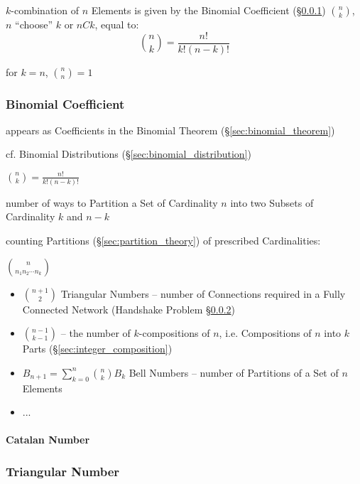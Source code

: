$k$-combination of $n$ Elements is given by the Binomial Coefficient
(\S\ref{sec:binomial_coefficient}) $\binom{n}{k}$, $n$ ``choose'' $k$ or $nCk$,
equal to:
\[
  \binom{n}{k} = \frac{n!}{k!(n - k)!}
\]

for $k = n$, $\binom{n}{n} = 1$



\subsubsection{Binomial Coefficient}\label{sec:binomial_coefficient}

appears as Coefficients in the Binomial Theorem (\S\ref{sec:binomial_theorem})

cf. Binomial Distributions (\S\ref{sec:binomial_distribution})

$\binom{n}{k} = \frac{n!}{k!(n - k)!}$

number of ways to Partition a Set of Cardinality $n$ into two Subsets of
Cardinality $k$ and $n-k$

counting Partitions (\S\ref{sec:partition_theory}) of prescribed Cardinalities:

$\binom{n}{n_1 n_2 \cdots n_k}$

\begin{itemize}
  \item $\binom{n+1}{2}$ Triangular Numbers -- number of Connections required in
    a Fully Connected Network (Handshake Problem \S\ref{sec:triangular_number})
  \item $\binom{n-1}{k-1}$ -- the number of $k$-compositions of $n$, i.e.
    Compositions of $n$ into $k$ Parts (\S\ref{sec:integer_composition})
  \item $B_{n+1} = \sum_{k=0}^n \binom{n}{k} B_k$ Bell Numbers -- number of
    Partitions of a Set of $n$ Elements
  \item ...
\end{itemize}



\paragraph{Catalan Number}\label{sec:catalan_number}\hfill



\subsubsection{Triangular Number}\label{sec:triangular_number}


